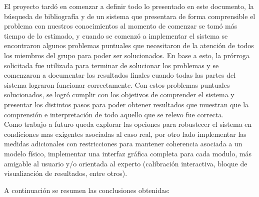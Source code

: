 El proyecto tardó en comenzar a definir todo lo presentado en este documento, la búsqueda de bibliografía y de un sistema que presentara de forma comprensible el problema con nuestros conocimientos al momento de comenzar se tomó más tiempo de lo estimado, y cuando se comenzó a implementar el sistema se encontraron algunos problemas puntuales que necesitaron de la atención de todos los miembros del grupo para poder ser solucionados. En base a esto, la prórroga solicitada fue utilizada para terminar de solucionar los problemas y se comenzaron a documentar los resultados finales cuando todas las partes del sistema lograron funcionar correctamente. Con estos problemas puntuales solucionados, se logró cumplir con los objetivos de comprender el sistema y presentar los distintos pasos para poder obtener resultados que muestran que la comprensión e interpretación de todo aquello que se relevo fue correcta.
\\ 

Como trabajo a futuro queda explorar las opciones para robustecer el sistema en condiciones mas exigentes asociadas al caso real, por otro lado implementar las medidas adicionales con restricciones para mantener coherencia asociada a un modelo físico, implementar una interfaz gráfica completa para cada modulo, más amigable al usuario y/o orientada al experto (calibración interactiva, bloque de visualización de resultados, entre otros).

A continuación se resumen las conclusiones obtenidas:

